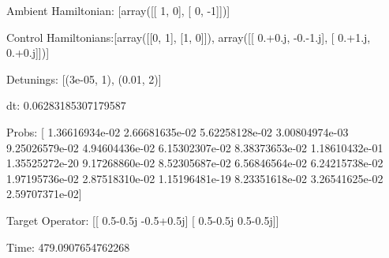 \documentclass{article}
\begin{document}
    

\newpage

Ambient Hamiltonian: [array([[ 1,  0],
       [ 0, -1]])]

Control Hamiltonians:[array([[0, 1],
       [1, 0]]), array([[ 0.+0.j, -0.-1.j],
       [ 0.+1.j,  0.+0.j]])]

Detunings: [(3e-05, 1), (0.01, 2)]

 dt: 0.06283185307179587

Probs: [  1.36616934e-02   2.66681635e-02   5.62258128e-02   3.00804974e-03
   9.25026579e-02   4.94604436e-02   6.15302307e-02   8.38373653e-02
   1.18610432e-01   1.35525272e-20   9.17268860e-02   8.52305687e-02
   6.56846564e-02   6.24215738e-02   1.97195736e-02   2.87518310e-02
   1.15196481e-19   8.23351618e-02   3.26541625e-02   2.59707371e-02]

Target Operator: [[ 0.5-0.5j -0.5+0.5j]
 [ 0.5-0.5j  0.5-0.5j]]

Time: 479.0907654762268
\end{document}
